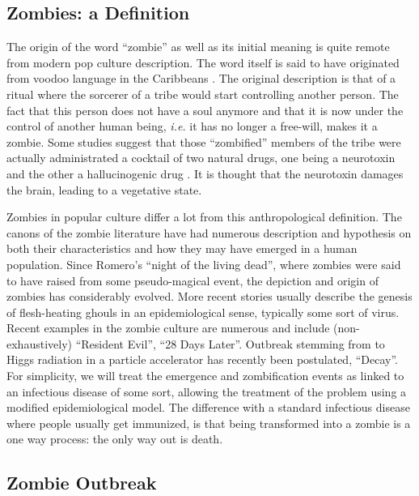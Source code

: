 \documentclass[11pt]{article} %
\begin{document}
\subsection{Zombies: a Definition}\indent

The origin of the word ``zombie'' as well as its initial meaning is quite remote from modern pop culture description. The word itself is said to have originated from voodoo language in the Caribbeans \cite{munz2009zombies}. The original description is that of a ritual where the sorcerer of a tribe would start controlling another person. The fact that this person does not have a soul anymore and that it is now under the control of another human being, \textit{i.e.} it has no longer a free-will, makes it a zombie. Some studies suggest that those ``zombified'' members of the tribe were actually administrated a cocktail of two natural drugs, one being a neurotoxin and the other a hallucinogenic drug \cite{littlewood1997clinical}. It is thought that the neurotoxin damages the brain, leading to a vegetative state.



Zombies in popular culture differ a lot from this anthropological definition. The canons of the zombie literature have had numerous description and hypothesis on both their characteristics and how they may have emerged in a human population. Since Romero's ``night of the living dead'', where zombies were said to have raised from some pseudo-magical event, the depiction and origin of zombies has considerably evolved. More recent stories usually describe the genesis of flesh-heating ghouls in an epidemiological sense, typically some sort of virus. Recent examples in the zombie culture are numerous and include (non-exhaustively) ``Resident Evil'', ``28 Days Later''. Outbreak stemming from to Higgs radiation in a particle accelerator has recently been postulated, ``Decay''. For simplicity, we will treat the emergence and zombification events as linked to an infectious disease of some sort, allowing the treatment of the problem using a modified epidemiological model. The difference with a standard infectious disease where people usually get immunized, is that being transformed into a zombie is a one way process: the only way out is death.



\subsection{Zombie Outbreak}\indent
\end{document}
